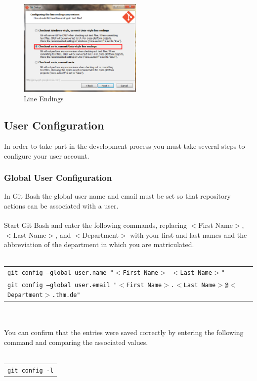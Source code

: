 \documentclass[]{report}
\begin{document}
\begin{figure}[h] 
  \centering
     \includegraphics[width=6cm]{gitbash2.jpg}
  \caption{Line Endings}
\end{figure}

\subsection{User Configuration}

In order to take part in the development process you must take several steps to configure your user account.

\subsubsection{Global User Configuration}
In Git Bash the global user name and email must be set so that repository actions can be associated with a user.\\
\\
Start Git Bash and enter the following commands, replacing $<$First Name$>$, $<$Last Name$>$, and $<$Department$>$ with your first and last names and the abbreviation of the department in which you are matriculated.\\
\\
\begin{tabular}{l}
\texttt{git config --global user.name "$<$First Name$>$ $<$Last Name$>$"}\\
\texttt{git config --global user.email "$<$First Name$>$.$<$Last Name$>$@$<$Department$>$.thm.de"}\\
\end{tabular}\\
\\
You can confirm that the entries were saved correctly by entering the following command and comparing the associated values.\\
\\
\begin{tabular}{l}
\texttt{git config -l}
\end{tabular}
\end{document}
